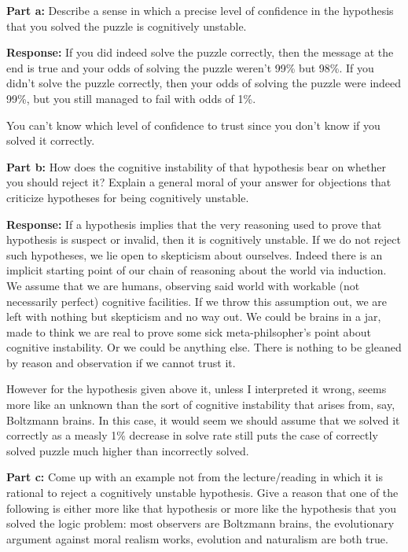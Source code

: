 \documentclass{article}
\begin{document}
\noindent\textbf{Part a:} Describe a sense in which a precise level of confidence in the hypothesis that you solved the puzzle is cognitively unstable.
\bigskip

\noindent\textbf{Response:} If you did indeed solve the puzzle correctly, then the message at the end is true and your odds of solving the puzzle weren't 99\% but 98\%. If you didn't solve the puzzle correctly, then your odds of solving the puzzle were indeed 99\%, but you still managed to fail with odds of 1\%.

You can't know which level of confidence to trust since you don't know if you solved it correctly.
\bigskip

\noindent\textbf{Part b:} How does the cognitive instability of that hypothesis bear on whether you should reject it? Explain a general moral of your answer for objections that criticize hypotheses for being cognitively unstable.
\bigskip

\noindent\textbf{Response:} If a hypothesis implies that the very reasoning used to prove that hypothesis is suspect or invalid, then it is cognitively unstable. If we do not reject such hypotheses, we lie open to skepticism about ourselves. Indeed there is an implicit starting point of our chain of reasoning about the world via induction. We assume that we are humans, observing said world with workable (not necessarily perfect) cognitive facilities. If we throw this assumption out, we are left with nothing but skepticism and no way out. We could be brains in a jar, made to think we are real to prove some sick meta-philsopher's point about cognitive instability. Or we could be anything else. There is nothing to be gleaned by reason and observation if we cannot trust it.

However for the hypothesis given above it, unless I interpreted it wrong, seems more like an unknown than the sort of cognitive instability that arises from, say, Boltzmann brains. In this case, it would seem we should assume that we solved it correctly as a measly 1\% decrease in solve rate still puts the case of correctly solved puzzle much higher than incorrectly solved.
\bigskip

\noindent\textbf{Part c:} Come up with an example not from the lecture/reading in which it is rational to reject a cognitively unstable hypothesis. Give a reason that one of the following is either more like that hypothesis or more like the hypothesis that you solved the logic problem: most observers are Boltzmann brains, the evolutionary argument against moral realism works, evolution and naturalism are both true.
\bigskip
\end{document}
